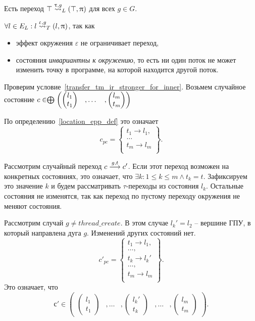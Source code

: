 Есть переход $\top \stackrel{\uptau, g}{\leadsto}_L (\top, \uppi)$ для всех $g\in G$.

$\forall l \in E_L: l \stackrel{\upvarepsilon, g}{\leadsto}_T (l, \uppi)$, так как 
\begin{itemize}
\item эффект окружения $\varepsilon$ не ограничивает переход,
\item состояния {\em инвариантны к окружению}, то есть ни один поток не может изменить точку в программе, на которой находится другой поток.
\end{itemize}

Проверим условие~\ref{transfer_tm_ir_stronger_for_inner}.
Возьмем случайное состояние $c \in \mathrel{\bigoplus}
\begin{pmatrix}
\begin{pmatrix}
l_1 \\
t_1 
\end{pmatrix}& ,
\dots& ,
\begin{pmatrix}
l_m \\
t_m 
\end{pmatrix}
\end{pmatrix}$

По определению~\ref{location_epp_def} это означает 
$$ c_{pc} = 
\left\lbrace
\begin{array}{c}
t_1 \to l_1,\\
\dots\\
t_m \to l_m\\
\end{array}
\right\rbrace.$$

Рассмотрим случайный переход $c \stackrel{g,t}{\longrightarrow} c'$. Если этот переход возможен на конкретных состояниях, это означает, что $\exists k : 1 \le k \le m \land t_k = t$. Зафиксируем это значение $k$ и будем рассматривать $\tau$-переходы из состояния $l_k$. Остальные состояния не изменятся, так как переход по пустому переходу окружения не меняют состояния.

Рассмотрим случай $g \neq thread\_create$. В этом случае $l_k' = l_2$ -- вершине ГПУ, в который направлена дуга $g$. Изменений других состояний нет. $$ c'_{pc} = 
\left\lbrace
\begin{array}{c}
t_1 \to l_1,\\
\dots,\\
t_k \to l_k'\\
\dots,\\
t_m \to l_m\\
\end{array}
\right\rbrace.$$ Это означает, что $$с' \in \begin{pmatrix}
\begin{pmatrix}
l_1 \\
t_1 
\end{pmatrix}& ,
\dots& ,
\begin{pmatrix}
l_k' \\
t_k 
\end{pmatrix}& ,
\dots& ,
\begin{pmatrix}
l_m \\
t_m 
\end{pmatrix}
\end{pmatrix}.$$

